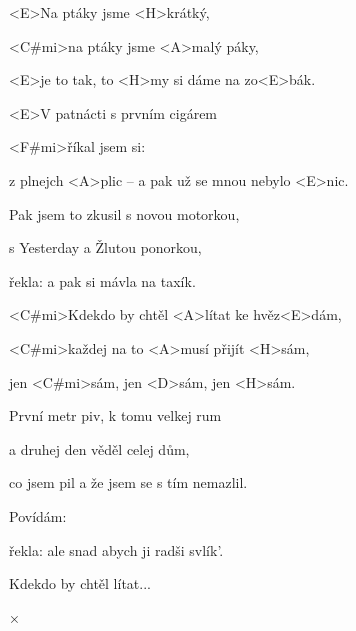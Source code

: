 

\zr
<E>Na ptáky jsme <H>krátký,

<C#mi>na ptáky jsme <A>malý páky,

<E>je to tak, to <H>my si dáme na zo<E>bák.
\kr

\zs
<E>V patnácti s prvním cigárem

<F#mi>říkal jsem si: 

z plnejch <A>plic -- a pak už se mnou nebylo <E>nic.
\ks

\zs
Pak jsem to zkusil s novou motorkou,

s Yesterday a Žlutou ponorkou,

řekla:  a pak si mávla na taxík.
\ks

\zs
<C#mi>Kdekdo by chtěl <A>lítat ke hvěz<E>dám,

<C#mi>každej na to <A>musí přijít <H>sám,

jen <C#mi>sám, jen <D>sám, jen <H>sám.
\ks

\zr
\kr

\zs
První metr piv, k tomu velkej rum

a druhej den věděl celej dům,

co jsem pil a že jsem se s tím nemazlil.
\ks

\zs
Povídám: 

řekla:  ale snad abych ji radši svlík'.
\ks

\zs
Kdekdo by chtěl lítat...
\ks

×
\kr

\kp
